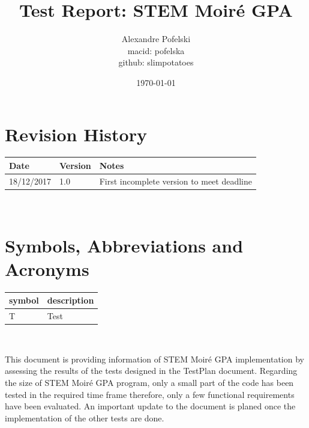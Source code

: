 \documentclass[12pt, titlepage]{article}
\newcommand{\progname}{STEM Moir{\'e} GPA}
\begin{document}
\title{Test Report: STEM Moir{\'e} GPA} 
\author{Alexandre Pofelski \\
		macid: pofelska \\
		github: slimpotatoes}
\date{\today}
	
\maketitle


\section{Revision History}

\begin{tabularx}{\textwidth}{p{3cm}p{2cm}X}
\toprule {\bf Date} & {\bf Version} & {\bf Notes}\\
\midrule
18/12/2017 & 1.0 & First incomplete version to meet deadline\\
\bottomrule
\end{tabularx}

~\newpage

\section{Symbols, Abbreviations and Acronyms}

\renewcommand{\arraystretch}{1.2}
\begin{tabular}{l l} 
  \toprule		
  \textbf{symbol} & \textbf{description}\\
  \midrule 
  T & Test\\
  \bottomrule
\end{tabular}\\


\newpage

\tableofcontents

\listoftables %

\listoffigures %

\newpage


This document is providing information of \progname{} implementation by assessing the results of the tests designed in the TestPlan document. Regarding the size of \progname{} program, only a small part of the code has been tested in the required time frame therefore, only a few functional requirements have been evaluated. An important update to the document is planed once the implementation of the other tests are done.
\newline
\end{document}
